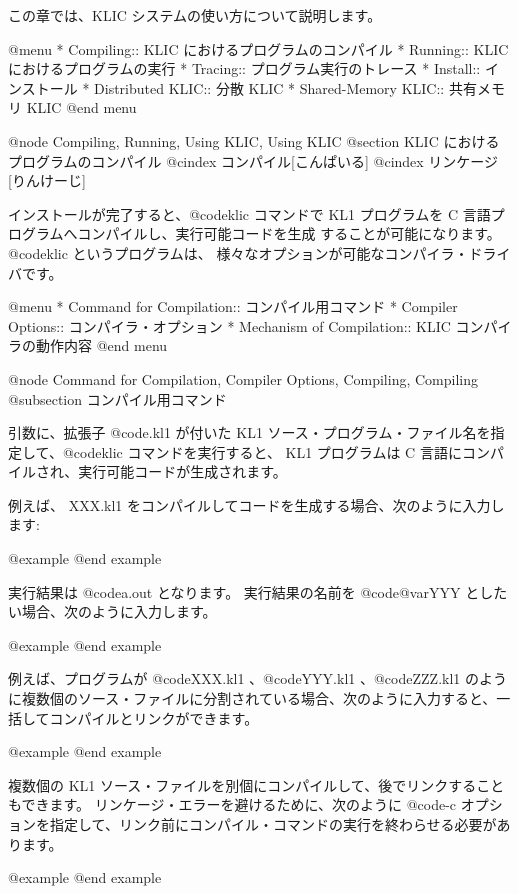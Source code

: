 {{{{この章では、KLIC システムの使い方について説明します。

@menu
* Compiling::                   KLIC におけるプログラムのコンパイル
* Running::                     KLIC におけるプログラムの実行
* Tracing::                     プログラム実行のトレース
* Install::                     インストール
* Distributed KLIC::            分散 KLIC
* Shared-Memory KLIC::          共有メモリ KLIC
@end menu

@node Compiling, Running, Using KLIC, Using KLIC
@section KLIC におけるプログラムのコンパイル
@cindex コンパイル[こんぱいる]
@cindex リンケージ[りんけーじ]

インストールが完了すると、@code{klic} コマンドで
KL1 プログラムを C 言語プログラムへコンパイルし、実行可能コードを生成
することが可能になります。
 @code{klic} というプログラムは、
様々なオプションが可能なコンパイラ・ドライバです。

@menu
* Command for Compilation::     コンパイル用コマンド
* Compiler Options::            コンパイラ・オプション
* Mechanism of Compilation::    KLIC コンパイラの動作内容
@end menu

@node Command for Compilation, Compiler Options, Compiling, Compiling
@subsection コンパイル用コマンド

引数に、拡張子 @code{.kl1} が付いた KL1 ソース・プログラム・ファイル名を指定して、@code{klic} コマンドを実行すると、 KL1 プログラムは C 言語にコンパイルされ、実行可能コードが生成されます。

例えば、 XXX.kl1 をコンパイルしてコードを生成する場合、次のように入力します:

@example
@end example

実行結果は @code{a.out} となります。
実行結果の名前を @code{@var{YYY}} としたい場合、次のように入力します。

@example
@end example

例えば、プログラムが @code{XXX.kl1} 、@code{YYY.kl1} 、@code{ZZZ.kl1} のように複数個のソース・ファイルに分割されている場合、次のように入力すると、一括してコンパイルとリンクができます。

@example
@end example

複数個の KL1 ソース・ファイルを別個にコンパイルして、後でリンクすることもできます。
リンケージ・エラーを避けるために、次のように @code{-c} オプションを指定して、リンク前にコンパイル・コマンドの実行を終わらせる必要があります。

@example
@end example

}}}}
